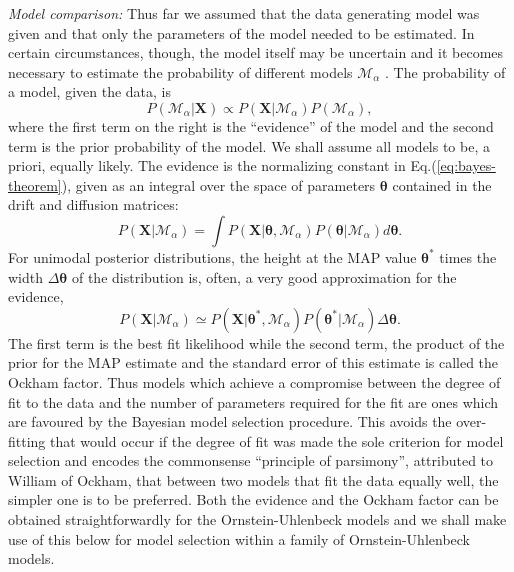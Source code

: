 \documentclass[english,aps, twocolumn, pre,superscriptaddress, notitlepage]{revtex4-1}
\begin{document}
\emph{Model comparison: }Thus far we assumed that the data generating
model was given and that only the parameters of the model needed to
be estimated. In certain circumstances, though, the model itself may
be uncertain and it becomes necessary to estimate the probability
of different models $\mathcal{M}_{\alpha}$ \cite{jeffreys1998theory,kashyap1977bayesian,mackay1992bayesian,zellner1996introduction,gregory2005bayesian}.
The probability of a model, given the data, is
\begin{equation}
P(\mathcal{M}_{\alpha}|\boldsymbol{X})\propto P(\boldsymbol{X}|\mathcal{M}_{\alpha})P(\mathcal{M}_{\alpha}),
\end{equation}
where the first term on the right is the ``evidence'' of the model
and the second term is the prior probability of the model. We shall
assume all models to be, a priori, equally likely. The evidence is
the normalizing constant in Eq.(\ref{eq:bayes-theorem}), given as
an integral over the space of parameters $\boldsymbol{\theta}$ contained
in the drift and diffusion matrices:
\begin{equation}
P(\boldsymbol{X}|\mathcal{M}_{\alpha})=\int P(\boldsymbol{X}|\boldsymbol{\theta},\mathcal{M}_{\alpha})P(\boldsymbol{\theta}|\mathcal{M}_{\alpha})d\boldsymbol{\theta}.
\end{equation}
For unimodal posterior distributions, the height at the MAP value
$\boldsymbol{\theta}^{\ast}$ times the width $\Delta\boldsymbol{\theta}$
of the distribution is, often, a very good approximation for the evidence,
\begin{equation}
P(\boldsymbol{X}|\mathcal{M}_{\alpha})\simeq P(\boldsymbol{X}|\boldsymbol{\theta}^{\ast},\mathcal{M}_{\alpha})P(\boldsymbol{\theta}^{\ast}|\mathcal{M}_{\alpha})\Delta\boldsymbol{\theta}.\label{eq:evidence}
\end{equation}
The first term is the best fit likelihood while the second term, the
product of the prior for the MAP estimate and the standard error of
this estimate is called the Ockham factor. Thus models which achieve
a compromise between the degree of fit to the data and the number
of parameters required for the fit are ones which are favoured by
the Bayesian model selection procedure. This avoids the over-fitting
that would occur if the degree of fit was made the sole criterion
for model selection and encodes the commonsense ``principle of parsimony'',
 attributed to William of Ockham, that between two models that fit
the data equally well, the simpler one is to be preferred. Both the
evidence and the Ockham factor can be obtained straightforwardly for
the Ornstein-Uhlenbeck models and we shall make use of this below
for model selection within a family of Ornstein-Uhlenbeck models. 
\end{document}
